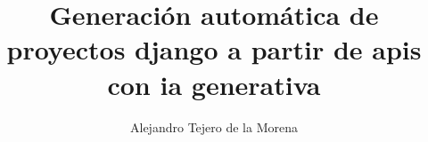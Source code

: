 \documentclass[a4paper, 12pt]{book}
\title{Generación automática de proyectos django a partir de apis con ia generativa}
\author{Alejandro Tejero de la Morena}
\begin{document}
\renewcommand{\refname}{Bibliografía}
\renewcommand{\appendixname}{Apéndice}









\tableofcontents 
\cleardoublepage
\listoffigures %












\cleardoublepage


%

% 


\end{document}
